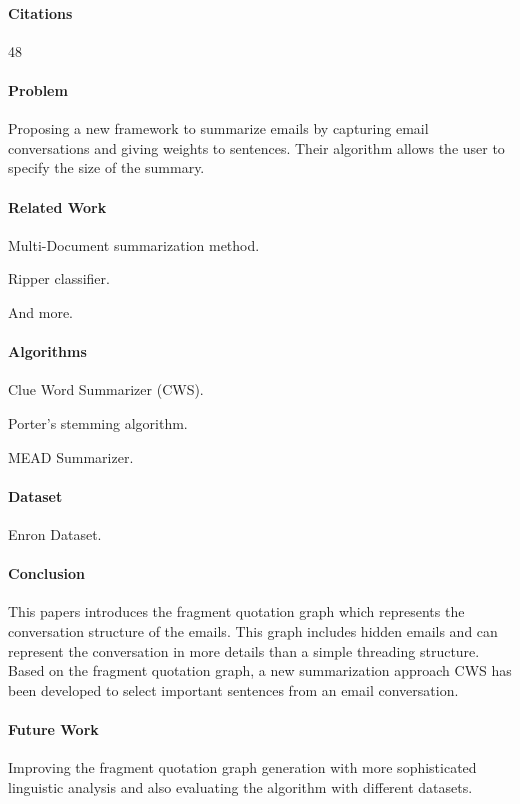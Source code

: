 \paragraph{Citations} 48

\paragraph{Problem} 
Proposing a new framework to summarize emails by capturing email conversations 
and giving weights to sentences. Their algorithm allows the user to specify the size of the summary.

\paragraph{Related Work}
\begin{my_itemize}
  \item Multi-Document summarization method.
  \item Ripper classifier.
  \item And more.
\end{my_itemize}

\paragraph{Algorithms}
\begin{my_itemize}
  \item Clue Word Summarizer (CWS).
  \item Porter’s stemming algorithm.
  \item MEAD Summarizer.
\end{my_itemize}

\paragraph{Dataset} Enron Dataset.

\paragraph{Conclusion}
This papers introduces the fragment quotation graph which represents the 
conversation structure of the emails. This graph includes hidden emails and can 
represent the conversation in more details than a simple threading structure.
Based on the fragment quotation graph, a new summarization approach CWS has 
been developed to select important sentences from an email conversation.

\paragraph{Future Work}
Improving the fragment quotation graph generation with more sophisticated linguistic
analysis and also evaluating the algorithm with different datasets.


